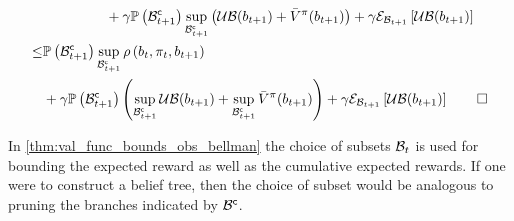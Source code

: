 \begin{proofE}
\begin{align*}
\begin{split}
			&+\gamma\measure{\stcompI{\subSpace}{t+1}}\sup_{\stcompI{\subSpace}{t+1}}\left(\upperbound(\blf{t+1})+\bar{V}^\pi(\blf{t+1})\right)+\gamma\partialexpectation{\upperbound(\blf{t+1})}{\subSpaceI{t+1}}
		\end{split}\\
		\begin{split}
			\leq&\measure{\stcompI{\subSpace}{t+1}}\sup_{\stcompI{\subSpace}{t+1}}\reward{\blf{t},\pi_t,\blf{t+1}}\\
			&+\gamma\measure{\stcompI{\subSpace}{t+1}}\left(\sup_{\stcompI{\subSpace}{t+1}}\upperbound(\blf{t+1})+\sup_{\stcompI{\subSpace}{t+1}}\bar{V}^\pi(\blf{t+1})\right)+\gamma\partialexpectation{\upperbound(\blf{t+1})}{\subSpaceI{t+1}}\qed
		\end{split}
	\end{align*}
\end{proofE}

In \cref{thm:val_func_bounds_obs_bellman} the choice of subsets $\subSpaceI{t}$ is used for bounding the expected reward as well as the cumulative expected rewards. If one were to construct a belief tree, then the choice of subset would be analogous to pruning the branches indicated by $\stcomp{\subSpace}$.

